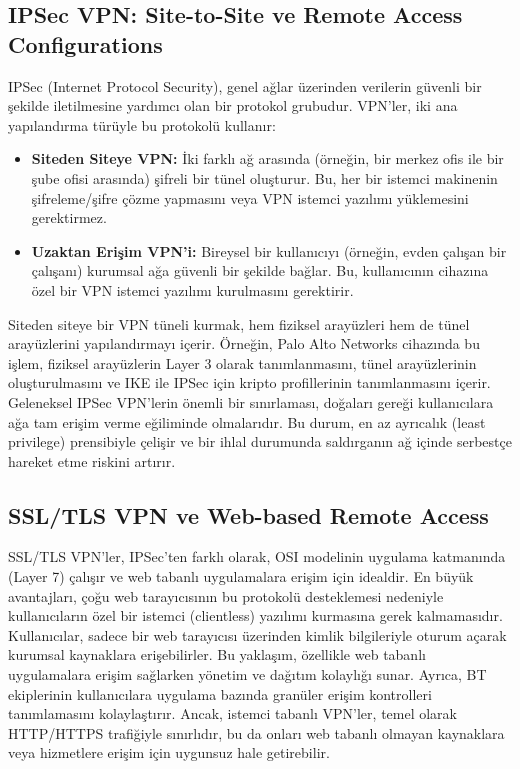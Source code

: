 \subsection{IPSec VPN: Site-to-Site ve Remote Access Configurations}

IPSec (Internet Protocol Security), genel ağlar üzerinden verilerin güvenli bir şekilde iletilmesine yardımcı olan bir protokol grubudur. VPN'ler, iki ana yapılandırma türüyle bu protokolü kullanır:

\begin{itemize}
\item \textbf{Siteden Siteye VPN:} İki farklı ağ arasında (örneğin, bir merkez ofis ile bir şube ofisi arasında) şifreli bir tünel oluşturur. Bu, her bir istemci makinenin şifreleme/şifre çözme yapmasını veya VPN istemci yazılımı yüklemesini gerektirmez.
\item \textbf{Uzaktan Erişim VPN'i:} Bireysel bir kullanıcıyı (örneğin, evden çalışan bir çalışanı) kurumsal ağa güvenli bir şekilde bağlar. Bu, kullanıcının cihazına özel bir VPN istemci yazılımı kurulmasını gerektirir.
\end{itemize}

Siteden siteye bir VPN tüneli kurmak, hem fiziksel arayüzleri hem de tünel arayüzlerini yapılandırmayı içerir. Örneğin, Palo Alto Networks cihazında bu işlem, fiziksel arayüzlerin Layer 3 olarak tanımlanmasını, tünel arayüzlerinin oluşturulmasını ve IKE ile IPSec için kripto profillerinin tanımlanmasını içerir.
Geleneksel IPSec VPN'lerin önemli bir sınırlaması, doğaları gereği kullanıcılara ağa tam erişim verme eğiliminde olmalarıdır. Bu durum, en az ayrıcalık (least privilege) prensibiyle çelişir ve bir ihlal durumunda saldırganın ağ içinde serbestçe hareket etme riskini artırır.

\subsection{SSL/TLS VPN ve Web-based Remote Access}
SSL/TLS VPN'ler, IPSec'ten farklı olarak, OSI modelinin uygulama katmanında (Layer 7) çalışır ve web tabanlı uygulamalara erişim için idealdir. En büyük avantajları, çoğu web tarayıcısının bu protokolü desteklemesi nedeniyle kullanıcıların özel bir istemci (clientless) yazılımı kurmasına gerek kalmamasıdır. Kullanıcılar, sadece bir web tarayıcısı üzerinden kimlik bilgileriyle oturum açarak kurumsal kaynaklara erişebilirler.
Bu yaklaşım, özellikle web tabanlı uygulamalara erişim sağlarken yönetim ve dağıtım kolaylığı sunar. Ayrıca, BT ekiplerinin kullanıcılara uygulama bazında granüler erişim kontrolleri tanımlamasını kolaylaştırır. Ancak, istemci tabanlı VPN'ler, temel olarak HTTP/HTTPS trafiğiyle sınırlıdır, bu da onları web tabanlı olmayan kaynaklara veya hizmetlere erişim için uygunsuz hale getirebilir.



